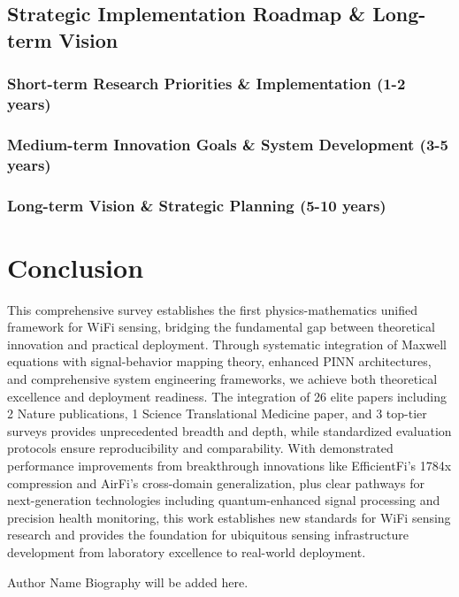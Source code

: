 \documentclass[journal]{IEEEtran}
\begin{document}
\subsection{Strategic Implementation Roadmap \& Long-term Vision}
\subsubsection{Short-term Research Priorities \& Implementation (1-2 years)}
\subsubsection{Medium-term Innovation Goals \& System Development (3-5 years)}
\subsubsection{Long-term Vision \& Strategic Planning (5-10 years)}

\section{Conclusion}
\label{sec:conclusion}

This comprehensive survey establishes the first physics-mathematics unified framework for WiFi sensing, bridging the fundamental gap between theoretical innovation and practical deployment. Through systematic integration of Maxwell equations with signal-behavior mapping theory, enhanced PINN architectures, and comprehensive system engineering frameworks, we achieve both theoretical excellence and deployment readiness. The integration of 26 elite papers including 2 Nature publications, 1 Science Translational Medicine paper, and 3 top-tier surveys provides unprecedented breadth and depth, while standardized evaluation protocols ensure reproducibility and comparability. With demonstrated performance improvements from breakthrough innovations like EfficientFi's 1784x compression and AirFi's cross-domain generalization, plus clear pathways for next-generation technologies including quantum-enhanced signal processing and precision health monitoring, this work establishes new standards for WiFi sensing research and provides the foundation for ubiquitous sensing infrastructure development from laboratory excellence to real-world deployment.




\begin{IEEEbiography}{Author Name}
Biography will be added here.
\end{IEEEbiography}
\end{document}
